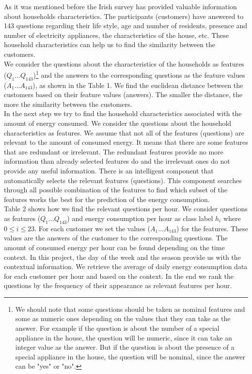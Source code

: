 \documentclass{sig-alternate-10pt}
\begin{document}
As it was mentioned before the Irish survey has provided valuable information about households characteristics. The participants (customers) have answered to 143 questions regarding their life style, age and number of residents, presence and number of electricity appliances, the characteristics of the house, etc. These household characteristics can help us to find the similarity between the customers.\\

We consider the questions about the characteristics of the households as features ($Q_1 \ldots Q_{143}$)\footnote {We should note that some questions should be taken as nominal features and some as numeric ones depending on the values that they can take as the answer. For example if the question is about the number of a special appliance in the house, the question will be numeric, since it can take an integer value as the answer. But if the question is about the presence of a special appliance in the house, the question will be nominal, since the answer can be "yes" or "no".} and the answers to the corresponding questions as the feature values ($A_1 \ldots A_{143}$), as shown in the Table 1. We find the euclidean distance between the customers based on their feature values (answers). The smaller the distance, the more the similarity between the customers.\\

In the next step we try to find the household characteristics associated with the amount of energy consumed. We consider the questions about the household characteristics as features. We assume that not all of the features (questions) are relevant to the amount of consumed energy. It means that there are some features that are redundant or irrelevant. The redundant features provide no more information than already selected features do and the irrelevant ones do not provide any useful information. There is an intelligent component that automatically selects the relevant features (questions). This component searches through all possible combination of the features to find which subset of the features works the best for the prediction of the energy consumption.\\

Table 2 shows how we find the relevant questions per hour. We consider questions as features ($Q_1 \ldots Q_{143}$) and energy consumption per hour as class label $h_i$ where $0 \le i \le 23$. For each customer we set the values ($A_1 \ldots A_{143}$) for the features. These values are the answers of the customer to the corresponding questions. The amount of consumed energy per hour can be found depending on the time context. In this project, the day of the week and the season provide us with the contextual information. We retrieve the average of daily energy consumption data for each customer per hour and based on the context. In the end we rank the questions by the frequency of their appearance as relevant features per hour.\\ 
\end{document}
